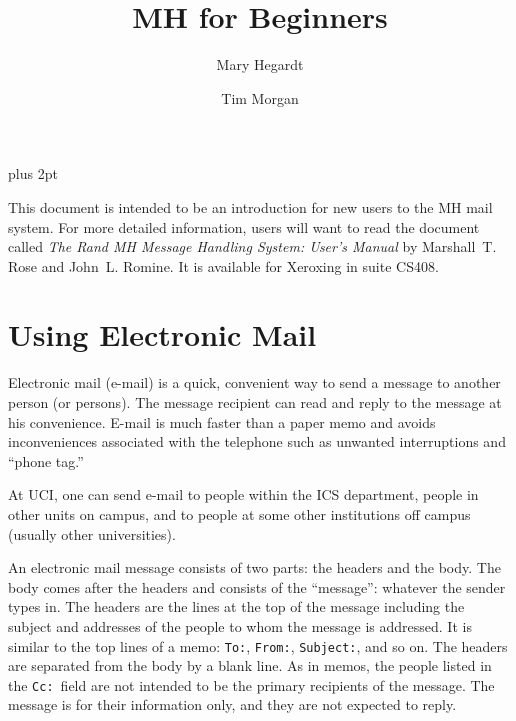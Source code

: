 \parindent=0pt
\parskip=7pt plus 2pt

\def\oneline#1{\par\bigskip\leftline{\tt\hskip.75in#1}}
\def\command#1{\par\bigskip\leftline{\tt\hskip.75in\% #1}}
\def\comarg#1#2{\par\bigskip\leftline{\tt\hskip.75in\% #1 {\it#2}}}
\def\MH/{{\sf MH}}
\def\MM/{{\sc mm}}
\def\unix/{{\sc Unix}}


\title{MH for Beginners}
\author{Mary Hegardt \and Tim Morgan}
\maketitle

This document is intended to be an introduction for new users to the
\MH/ mail system. For more detailed information, users will want to
read the document called {\sl The Rand MH Message Handling System:
User's Manual\/} by Marshall~T. Rose and John~L. Romine. It is available
for Xeroxing in suite CS408.

\section{Using Electronic Mail}

Electronic mail (e-mail) is a quick, convenient way to send a message
to another person (or persons).  The message recipient can read and
reply to the message at his convenience. E-mail is much faster than
a paper memo and avoids inconveniences associated with the telephone
such as unwanted interruptions and ``phone tag.''

At UCI, one can send e-mail to people within the ICS department, people
in other units on campus, and to people at some other institutions
off campus (usually other universities).

An electronic mail message consists of two parts: the headers and the
body.  The body comes after the headers and consists of the ``message'':
whatever the sender types in. The headers are the lines at the top
of the message including the subject and addresses of the people
to whom the message is addressed.  It is similar to the top lines
of a memo: {\tt To:}, {\tt From:}, {\tt Subject:}, and so on.  The headers
are separated from the body by a blank line. As in memos, the people
listed in the {\tt Cc:}\ field are not intended to be the primary recipients 
of the message. The message is for their information only, and they
are not expected to reply.


